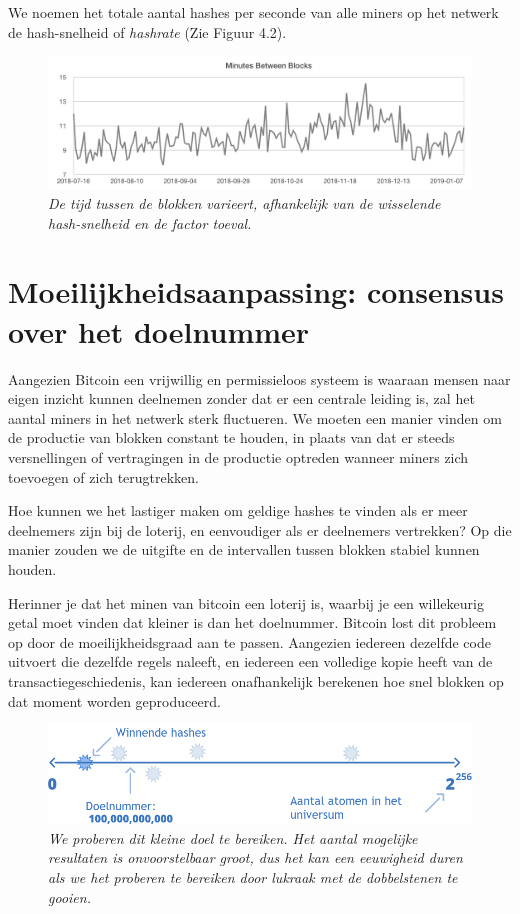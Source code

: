 We noemen het totale aantal hashes per seconde van alle miners op het netwerk de hash-snelheid of \textit{hashrate} (Zie Figuur 4.2).

\begin{figure}[h]
    \centering
    \includegraphics[width=\textwidth]{images/fig7.png}
    \caption{\footnotesize{\textit{De tijd tussen de blokken varieert, afhankelijk van de wisselende hash-snelheid en de factor toeval.}}}
    \label{fig7}
\end{figure}


\section{Moeilijkheidsaanpassing: consensus over het doelnummer}

Aangezien Bitcoin een vrijwillig en permissieloos systeem is waaraan mensen naar eigen inzicht kunnen deelnemen zonder dat er een centrale leiding is, zal het aantal miners in het netwerk sterk fluctueren. We moeten een manier vinden om de productie van blokken constant te houden, in plaats van dat er steeds versnellingen of vertragingen in de productie optreden wanneer miners zich toevoegen of zich terugtrekken.

Hoe kunnen we het lastiger maken om geldige hashes te vinden als er meer deelnemers zijn bij de loterij, en eenvoudiger als er deelnemers vertrekken? Op die manier zouden we de uitgifte en de intervallen tussen blokken stabiel kunnen houden.

Herinner je dat het minen van bitcoin een loterij is, waarbij je een willekeurig getal moet vinden dat kleiner is dan het doelnummer. Bitcoin lost dit probleem op door de moeilijkheidsgraad aan te passen. Aangezien iedereen dezelfde code uitvoert die dezelfde regels naleeft, en iedereen een volledige kopie heeft van de transactiegeschiedenis, kan iedereen onafhankelijk berekenen hoe snel blokken op dat moment worden geproduceerd.

\begin{figure}[h]
    \centering
    \includegraphics[width=\textwidth]{images/fig5.png}
    \caption{\footnotesize{\textit{We proberen dit kleine doel te bereiken. Het aantal mogelijke resultaten is onvoorstelbaar groot, dus het kan een eeuwigheid duren als we het proberen te bereiken door lukraak met de dobbelstenen te gooien.}}}
    \label{fig8}
\end{figure}

